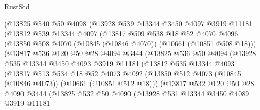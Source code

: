 \begin{lexlean}{RustStd}
\begin{coremodule}
              (@13825
                @540
                @50
                @4098
                (@13928
                  @539
                  @13344
                  @3450
                  @4097
                  @3919
                  @11181
                  (@13812
                    @539
                    @13344
                    @4097
                    (@13817
                      @509
                      @538
                      @18
                      @52
                      @4070
                      @4096
                      (@13850 @508 @4070 (@10845 (@10846 @4070)) (@10661 (@10851 @508 @18)))
                      (@13817
                        @536
                        @120
                        @50
                        @28
                        @4094
                        @3444
                        (@13825
                          @536
                          @50
                          @4094
                          (@13928
                            @535
                            @13344
                            @3450
                            @4093
                            @3919
                            @11181
                            (@13812
                              @535
                              @13344
                              @4093
                              (@13817
                                @513
                                @534
                                @18
                                @52
                                @4073
                                @4092
                                (@13850
                                  @512
                                  @4073
                                  (@10845 (@10846 @4073))
                                  (@10661 (@10851 @512 @18)))
                                (@13817
                                  @532
                                  @120
                                  @50
                                  @28
                                  @4090
                                  @3444
                                  (@13825
                                    @532
                                    @50
                                    @4090
                                    (@13928
                                      @531
                                      @13344
                                      @3450
                                      @4089
                                      @3919
                                      @11181

\end{coremodule}
\end{lexlean}
